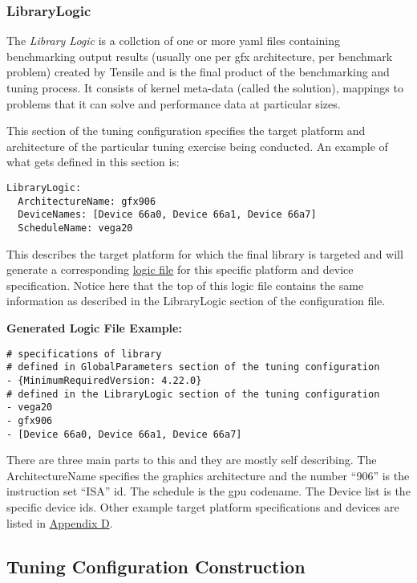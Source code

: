\documentclass[]{article}
\begin{document}
\label{sec:LibraryLogic}
\subsubsection{LibraryLogic}

The \emph{Library Logic} is a collction of one or more yaml files containing benchmarking output results (usually one per gfx architecture, per benchmark problem) created by Tensile and is the final product of the benchmarking and tuning process. It consists of kernel meta-data (called the solution), mappings to problems that it can solve and performance data at particular sizes.

This section of the tuning configuration specifies the target platform and architecture of the particular tuning exercise being conducted. An example of what gets defined in this section is:

\begin{verbatim}
LibraryLogic:
  ArchitectureName: gfx906
  DeviceNames: [Device 66a0, Device 66a1, Device 66a7]
  ScheduleName: vega20
\end{verbatim}
\noindent
This describes the target platform for which the final library is targeted and will generate a corresponding \hyperref[sec:logicFile]{logic file} for this specific platform and device specification. Notice here that the top of this logic file contains the same information as described in the LibraryLogic section of the configuration file. \newline

\noindent \textbf{Generated Logic File Example:}
\begin{verbatim}
# specifications of library
# defined in GlobalParameters section of the tuning configuration
- {MinimumRequiredVersion: 4.22.0}
# defined in the LibraryLogic section of the tuning configuration
- vega20
- gfx906
- [Device 66a0, Device 66a1, Device 66a7]
\end{verbatim}

There are three main parts to this and they are mostly self describing. The ArchitectureName specifies the graphics architecture and the number ``906'' is the instruction set ``ISA'' id. The schedule is the gpu codename. The Device list is the specific device ids. Other example target platform specifications and devices are listed in \hyperref[sec:appendixD]{Appendix D}.


\subsection{Tuning Configuration Construction}
\end{document}
